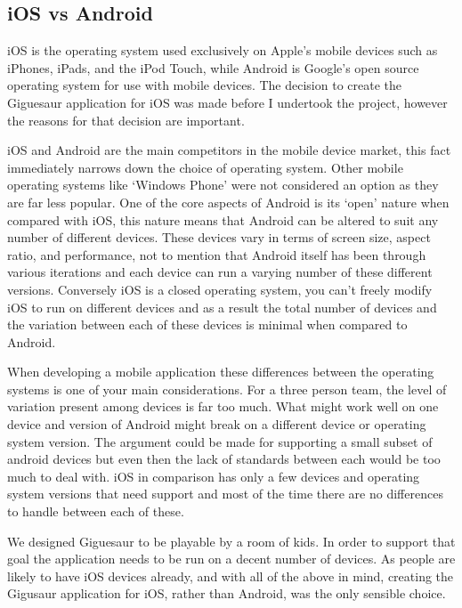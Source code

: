 \documentclass{article}
\begin{document}
\subsection{iOS vs Android}


iOS is the operating system used exclusively on Apple's mobile devices such as iPhones, iPads, and the iPod Touch, while Android is Google's open source operating system for use with mobile devices. The decision to create the Giguesaur application for iOS was made before I undertook the project, however the reasons for that decision are important. 

iOS and Android are the main competitors in the mobile device market, this fact immediately narrows down the choice of operating system. Other mobile operating systems like `Windows Phone' were not considered an option as they are far less popular. One of the core aspects of Android is its `open' nature when compared with iOS, this nature means that Android can be altered to suit any number of different devices. These devices vary in terms of screen size, aspect ratio, and performance, not to mention that Android itself has been through various iterations and each device can run a varying number of these different versions. Conversely iOS is a closed operating system, you can't freely modify iOS to run on different devices and as a result the total number of devices and the variation between each of these devices is minimal when compared to Android. 

When developing a mobile application these differences between the operating systems is one of your main considerations. For a three person team, the level of variation present among devices is far too much. What might work well on one device and version of Android might break on a different device or operating system version. The argument could be made for supporting a small subset of android devices but even then the lack of standards between each would be too much to deal with. iOS in comparison has only a few devices and operating system versions that need support and most of the time there are no differences to handle between each of these. 

We designed Giguesaur to be playable by a room of kids. In order to support that goal the application needs to be run on a decent number of devices. As people are likely to have iOS devices already, and with all of the above in mind, creating the Gigusaur application for iOS, rather than Android, was the only sensible choice. 
\end{document}
